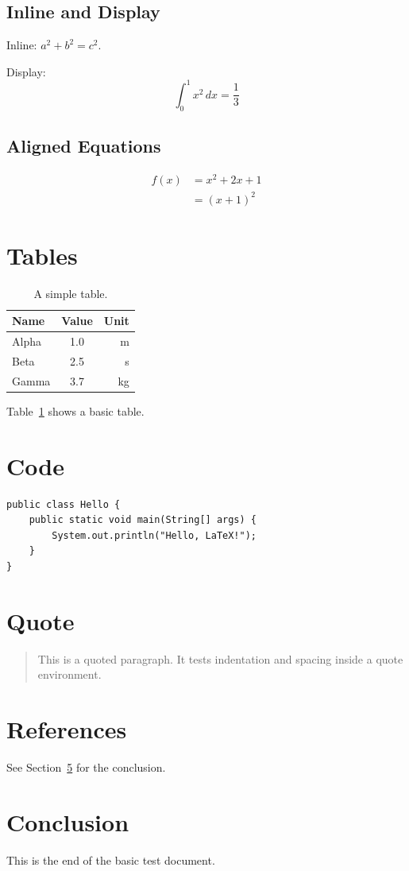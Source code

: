 \documentclass[12pt,a4paper]{article}
\begin{document}
\subsection{Inline and Display}

Inline: $a^2 + b^2 = c^2$.

Display:
\[
  \int_{0}^{1} x^2 \, dx = \frac{1}{3}
\]

\subsection{Aligned Equations}

\begin{align}
  f(x) &= x^2 + 2x + 1 \\
       &= (x + 1)^2
\end{align}

\section{Tables}

\begin{table}[h]
  \centering
  \begin{tabular}{lcr}
    \toprule
    Name & Value & Unit \\
    \midrule
    Alpha & 1.0 & m \\
    Beta  & 2.5 & s \\
    Gamma & 3.7 & kg \\
    \bottomrule
  \end{tabular}
  \caption{A simple table.}
  \label{tab:simple}
\end{table}

Table~\ref{tab:simple} shows a basic table.

\section{Code}

\begin{verbatim}
public class Hello {
    public static void main(String[] args) {
        System.out.println("Hello, LaTeX!");
    }
}
\end{verbatim}

\section{Quote}

\begin{quote}
This is a quoted paragraph. It tests indentation and spacing inside a quote environment.
\end{quote}

\section{References}

See Section~\ref{sec:conclusion} for the conclusion.

\section{Conclusion}
\label{sec:conclusion}

This is the end of the basic test document.
\end{document}
